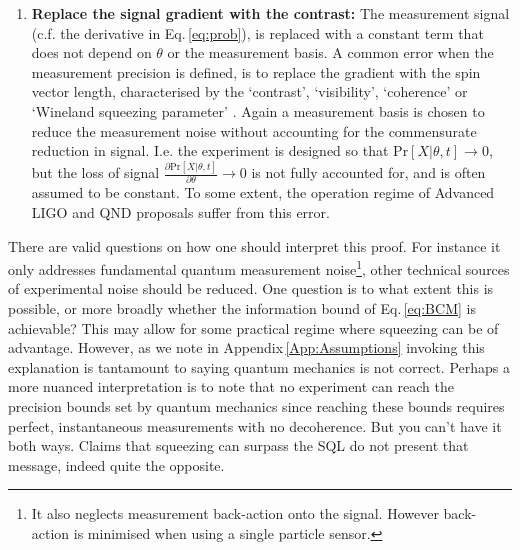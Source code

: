 \documentclass[reqno]{amsart}
\def\func#1#2{\mathrm{#1}\left[#2\right]}
\begin{document}
\begin{enumerate}
\item \textbf{Replace the signal gradient with the contrast:} The measurement signal (c.f. the derivative in Eq.\,\eqref{eq:prob}), is replaced with a constant term that does not depend on $\theta$ or the measurement basis. A common error when the measurement precision is defined, is to replace the gradient with the spin vector length, characterised by the `contrast', `visibility', `coherence' or `Wineland squeezing parameter' \cite{Meyer2001, Esteve2008, Gross2010, Leroux2010, Leroux2010a, Riedel2010, Hosten2016, PedrozoPenafiel2020, Malia2020, Malia2022, Eckner2023}. Again a measurement basis is chosen to reduce the measurement noise without accounting for the commensurate reduction in signal. I.e. the experiment is designed so that $\func{Pr}{X|\theta,t} \rightarrow 0$, but the loss of signal $\frac{\partial \func{Pr}{X|\theta,t}}{\partial \theta} \rightarrow 0$ is not fully accounted for, and is often assumed to be constant. To some extent, the operation regime of Advanced LIGO \cite{Aasi2015, Tse2022} and QND proposals \cite{Braginsky1980, Kimble2001} suffer from this error.

\end{enumerate}


There are valid questions on how one should interpret this proof. For instance it only addresses fundamental quantum measurement noise\footnote{It also neglects measurement back-action onto the signal. However back-action is minimised when using a single particle sensor.}, other technical sources of experimental noise should be reduced. One question is to what extent this is possible, or more broadly whether the information bound of Eq.\,\eqref{eq:BCM} is achievable? This may allow for some practical regime where squeezing can be of advantage. However, as we note in Appendix\,\ref{App:Assumptions} invoking this explanation is tantamount to saying quantum mechanics is not correct. Perhaps a more nuanced interpretation is to note that no experiment can reach the precision bounds set by quantum mechanics since reaching these bounds requires perfect, instantaneous measurements with no decoherence. But you can't have it both ways. Claims that squeezing can surpass the SQL do not present that message, indeed quite the opposite.
\end{document}
